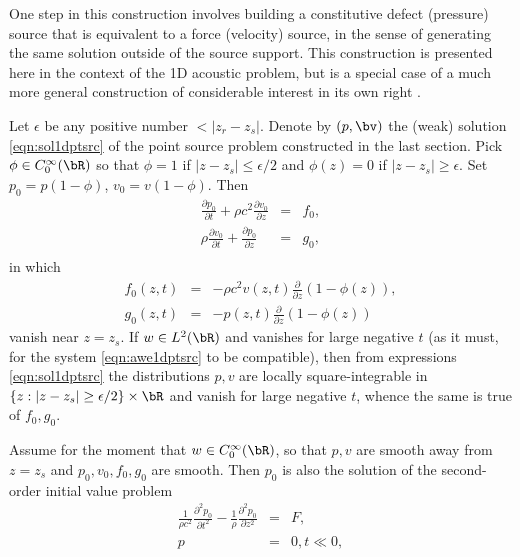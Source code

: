 One step in this construction involves building a constitutive defect
(pressure) source that is equivalent to a force (velocity) source, in the sense of generating the
same solution outside of the source support. This construction is
presented here in the context of the 1D acoustic problem, but is a
special case of a much more general construction of considerable
interest in its own right \cite[]{BurridgeKnopoff:64}.

Let
$\epsilon$ be any positive number $<|z_r-z_s|$. 
Denote by $(p,\bv)$ the (weak) solution \ref{eqn:sol1dptsrc} of the point source
problem constructed in the last section.
Pick $\phi \in C_0^{\infty}(\bR)$ so that
$\phi = 1$ if $|z-z_s| \le \epsilon/2$ and $\phi(z)=0$ if $|z-z_s|
\ge\epsilon$. Set $p_0=p(1-\phi)$, $v_0=v(1-\phi)$. Then
\begin{eqnarray}
\label{eqn:awecut}
\frac{\partial p_0}{\partial t} + \rho c^2 \frac{\partial
  v_0}{\partial z} &=&
                            f_0,  \nonumber\\
\rho \frac{\partial v_0}{\partial t} +\frac{\partial p_0}{\partial z} &=& g_0, \nonumber\\
\end{eqnarray}
in which
\begin{eqnarray}
  \label{eqn:rhscut}
  f_0(z,t) &=& -\rho c^2 v(z,t) \frac{\partial}{\partial z}(1-\phi(z)),\nonumber\\
  g_0(z,t) &=& -p(z,t) \frac{\partial}{\partial z}(1-\phi(z))
\end{eqnarray}
vanish near $z=z_s$. If $w \in L^2(\bR)$ and vanishes for large
negative $t$ (as it must, for the system \ref{eqn:awe1dptsrc} to be
compatible), then from expressions \ref{eqn:sol1dptsrc} the
distributions $p,v$ are locally square-integrable in
$\{z:|z-z_s| \ge \epsilon/2\} \times \bR$ and vanish for large
negative $t$, whence the same is true of $f_0,g_0$.

Assume for the moment that $w \in C^{\infty}_0(\bR)$, so that $p,v$
are smooth away from $z=z_s$ and $p_0, v_0, f_0, g_0$ are smooth. Then
$p_0$ is also the solution of the second-order initial value problem
\begin{eqnarray}
  \label{eqn:awe2ord}
  \frac{1}{\rho c^2} \frac{\partial^2 p_0}{\partial t^2} -
  \frac{1}{\rho}\frac{\partial^2 p_0}{\partial z^2} &=& F,\nonumber \\
  p &=& 0, t\ll 0,
\end{eqnarray}
   
